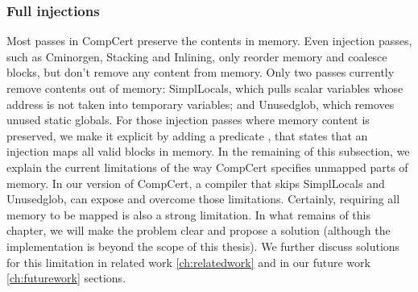 %

   
   
\subsubsection{Full injections} Most passes in CompCert preserve the contents in memory. Even injection passes, such as Cminorgen, Stacking and Inlining, only reorder memory and coalesce blocks, but don't remove any content from memory. Only two passes currently remove contents out of memory: SimplLocals, which pulls scalar variables whose address is not taken into temporary variables; and Unusedglob, which removes unused static globals. For those injection passes where memory content is preserved, we make it explicit by adding a predicate , that states that an injection maps all valid blocks in memory. In the remaining of this subsection, we explain the current limitations of the way CompCert specifies unmapped parts of memory. In our version of CompCert, a compiler that skips SimplLocals and Unusedglob, can expose  and overcome those limitations. Certainly, requiring all memory to be mapped is also a strong limitation. In what remains of this chapter, we will make the problem clear and propose a solution (although the implementation is beyond the scope of this thesis). We further discuss solutions for this limitation in related work \ref{ch:relatedwork} and in our future work \ref{ch:futurework} sections.

